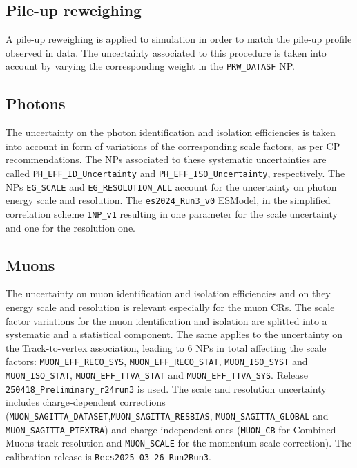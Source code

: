 \subsection{Pile-up reweighing}
A pile-up reweighing is applied to simulation in order to match the pile-up profile observed in data. The uncertainty associated to this procedure is taken into account by varying the corresponding weight in the \texttt{PRW\_DATASF} NP.

\subsection{Photons}
The uncertainty on the photon identification and isolation efficiencies is taken into account in form of variations of the corresponding scale factors, as per CP recommendations. The NPs associated to these systematic uncertainties are called \texttt{PH\_EFF\_ID\_Uncertainty} and \texttt{PH\_EFF\_ISO\_Uncertainty}, respectively. 
The NPs \texttt{EG\_SCALE} and \texttt{EG\_RESOLUTION\_ALL} account for the uncertainty on photon energy scale and resolution. The \texttt{es2024\_Run3\_v0} ESModel, in the simplified correlation scheme \texttt{1NP\_v1} resulting in one parameter for the scale uncertainty and one for the resolution one. 

\subsection{Muons}
The uncertainty on muon identification and isolation efficiencies and on they energy scale and resolution is relevant especially for the muon CRs. 
The scale factor variations for the muon identification and isolation are splitted into a systematic and a statistical component. The same applies to the uncertainty on the Track-to-vertex association, leading to 6 NPs in total affecting the scale factors: \texttt{MUON\_EFF\_RECO\_SYS}, \texttt{MUON\_EFF\_RECO\_STAT}, \texttt{MUON\_ISO\_SYST} and \texttt{MUON\_ISO\_STAT}, \texttt{MUON\_EFF\_TTVA\_STAT} and \texttt{MUON\_EFF\_TTVA\_SYS}. Release \texttt{250418\_Preliminary\_r24run3} is used. 
The scale and resolution uncertainty includes charge-dependent corrections (\texttt{MUON\_SAGITTA\_DATASET},\texttt{MUON\_SAGITTA\_RESBIAS}, \texttt{MUON\_SAGITTA\_GLOBAL} and \texttt{MUON\_SAGITTA\_PTEXTRA}) and charge-independent ones (\texttt{MUON\_CB} for Combined Muons track resolution and \texttt{MUON\_SCALE} for the momentum scale correction). The calibration release is \texttt{Recs2025\_03\_26\_Run2Run3}. 

